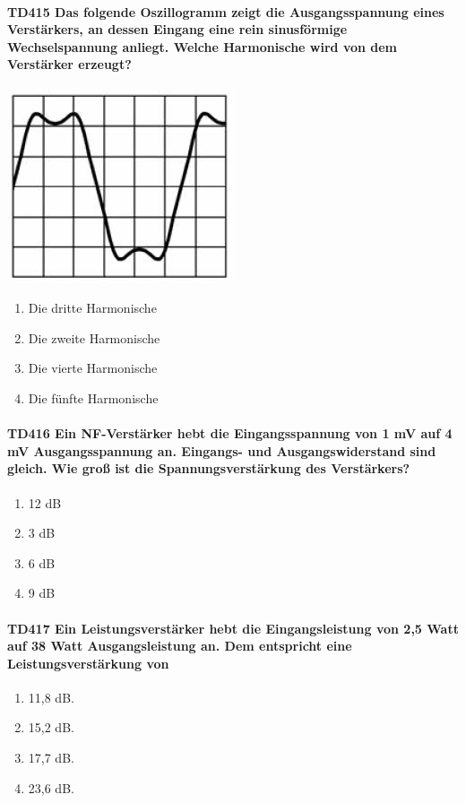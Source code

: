\documentclass[8pt]{article}
\begin{document}
\begin{enumerate}
\begin{enumerate}[nolistsep,label=\Alph*]
\paragraph*{TD415 Das folgende Oszillogramm zeigt die Ausgangsspannung eines Verstärkers, an dessen Eingang eine rein sinusförmige Wechselspannung anliegt. Welche Harmonische wird von dem Verstärker erzeugt?}
\begin{center}
	\begin{minipage}{\linewidth}
		\centering
		\includegraphics[scale=1.0]{pics/td415_a.jpg}
	\end{minipage}
\end{center}
\begin{enumerate}[nolistsep,label=\Alph*]
\item Die dritte Harmonische 
\item Die zweite Harmonische 
\item Die vierte Harmonische
\item Die fünfte Harmonische
\end{enumerate}

\paragraph*{TD416 Ein NF-Verstärker hebt die Eingangsspannung von 1 mV auf 4 mV Ausgangsspannung an. Eingangs- und Ausgangswiderstand sind gleich. Wie groß ist die Spannungsverstärkung des Verstärkers?}
\begin{enumerate}[nolistsep,label=\Alph*]
\item 12 dB
\item 3 dB
\item 6 dB
\item 9 dB
\end{enumerate}

\paragraph*{TD417 Ein Leistungsverstärker hebt die Eingangsleistung von 2,5 Watt auf 38 Watt Ausgangsleistung an. Dem entspricht eine Leistungsverstärkung von}
\begin{enumerate}[nolistsep,label=\Alph*]
\item 11,8 dB.
\item 15,2 dB.
\item 17,7 dB.
\item 23,6 dB.
\end{enumerate}


\end{enumerate}
\end{enumerate}
\end{document}
